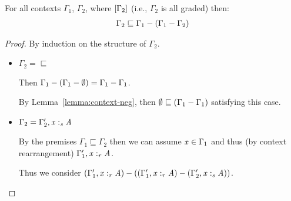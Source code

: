 \begin{lemma}
\label{lemma:contexts-subsub}
For all contexts $\Gamma_{{\mathrm{1}}}$, $\Gamma_{{\mathrm{2}}}$, where
$[  \Gamma_{{\mathrm{2}}}  ]$ (i.e., $\Gamma_{{\mathrm{2}}}$ is all graded)
then:
%
\begin{align*}
\Gamma_{{\mathrm{2}}} \sqsubseteq \Gamma_{{\mathrm{1}}}  -  (  \Gamma_{{\mathrm{1}}}  -  \Gamma_{{\mathrm{2}}}  )
\end{align*}
\end{lemma}

\begin{proof}
By induction on the structure of $\Gamma_{{\mathrm{2}}}$.

\begin{itemize}
\item $\Gamma_{{\mathrm{2}}} = \sqsubseteq$

Then $\Gamma_{{\mathrm{1}}}  -  (  \Gamma_{{\mathrm{1}}}  -   \emptyset   ) = \Gamma_{{\mathrm{1}}}  -  \Gamma_{{\mathrm{1}}}$.

By Lemma~\ref{lemma:context-neg}, then $ \emptyset \sqsubseteq (  \Gamma_{{\mathrm{1}}}  -  \Gamma_{{\mathrm{1}}}  )$
satisfying this case.

\item $\Gamma_{{\mathrm{2}}} = \Gamma'_{{\mathrm{2}}}  \GRANULEsym{,}   \GRANULEmv{x}  :_{\textcolor{coeffectColor}{  \GRANULEnt{s}  } }   \GRANULEnt{A}$

By the premises $\Gamma_{{\mathrm{1}}} \sqsubseteq \Gamma_{{\mathrm{2}}}$ then we can
assume $\mathit{x} \in \Gamma_{{\mathrm{1}}}$ and thus (by context
rearrangement) $\Gamma'_{{\mathrm{1}}}  \GRANULEsym{,}   \GRANULEmv{x}  :_{\textcolor{coeffectColor}{  \GRANULEnt{r}  } }   \GRANULEnt{A}$.

Thus we consider $\GRANULEsym{(}  \Gamma'_{{\mathrm{1}}}  \GRANULEsym{,}   \GRANULEmv{x}  :_{\textcolor{coeffectColor}{  \GRANULEnt{r}  } }   \GRANULEnt{A}   \GRANULEsym{)}  \GRANULEsym{-}  \GRANULEsym{(}  \GRANULEsym{(}  \Gamma'_{{\mathrm{1}}}  \GRANULEsym{,}   \GRANULEmv{x}  :_{\textcolor{coeffectColor}{  \GRANULEnt{r}  } }   \GRANULEnt{A}   \GRANULEsym{)}  \GRANULEsym{-}  \GRANULEsym{(}  \Gamma'_{{\mathrm{2}}}  \GRANULEsym{,}   \GRANULEmv{x}  :_{\textcolor{coeffectColor}{  \GRANULEnt{s}  } }   \GRANULEnt{A}   \GRANULEsym{)}  \GRANULEsym{)}$.


\end{itemize}
\end{proof}
